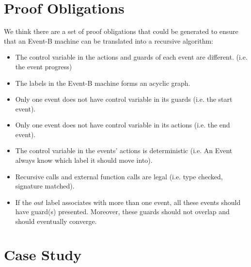 \documentclass{easychair}
\begin{document}
\section{Proof Obligations}
We think there are a set of proof obligations that could be generated to ensure that an Event-B machine can be translated into a recursive algorithm:
\begin{itemize}
	\item The control variable in the actions and guards of each event are different. (i.e. the event progress)
	\item The labels in the Event-B machine forms an acyclic graph.
	\item Only one event does not have control variable in its guards (i.e. the start event).
	\item Only one event does not have control variable in its actions (i.e. the end event).
	\item The control variable in the events' actions is deterministic (i.e. An Event always know which label it should move into).
	\item Recursive calls and external function calls are legal (i.e. type checked, signature matched).
	\item If the $out$ label associates with more than one event, all these events should have guard(s) presented. Moreover, these guards should not overlap and should eventually converge.
\end{itemize}

\newpage
\section{Case Study}
\end{document}
